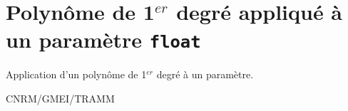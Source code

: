 %
\section{Polyn\^ome de 1$^{er}$ degr\'e appliqu\'e \`a un param\`etre \texttt{float}}

 
\label{OP-Poly_1_flt}

Application d'un polyn\^ome de 1$^{er}$ degr\'e
\`a un param\`etre.

\bigskip





CNRM/GMEI/TRAMM


